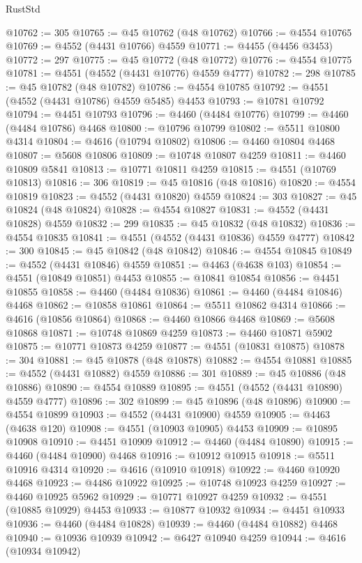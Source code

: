 \begin{lexlean}{RustStd}
\begin{coremodule}
@10762 := 305
@10765 := @45 @10762 (@48 @10762)
@10766 := @4554 @10765
@10769 := @4552 (@4431 @10766) @4559
@10771 := @4455 (@4456 @3453)
@10772 := 297
@10775 := @45 @10772 (@48 @10772)
@10776 := @4554 @10775
@10781 := @4551 (@4552 (@4431 @10776) @4559 @4777)
@10782 := 298
@10785 := @45 @10782 (@48 @10782)
@10786 := @4554 @10785
@10792 := @4551 (@4552 (@4431 @10786) @4559 @5485) @4453
@10793 := @10781 @10792
@10794 := @4451 @10793
@10796 := @4460 (@4484 @10776)
@10799 := @4460 (@4484 @10786) @4468
@10800 := @10796 @10799
@10802 := @5511 @10800 @4314
@10804 := @4616 (@10794 @10802)
@10806 := @4460 @10804 @4468
@10807 := @5608 @10806
@10809 := @10748 @10807 @4259
@10811 := @4460 @10809 @5841
@10813 := @10771 @10811 @4259
@10815 := @4551 (@10769 @10813)
@10816 := 306
@10819 := @45 @10816 (@48 @10816)
@10820 := @4554 @10819
@10823 := @4552 (@4431 @10820) @4559
@10824 := 303
@10827 := @45 @10824 (@48 @10824)
@10828 := @4554 @10827
@10831 := @4552 (@4431 @10828) @4559
@10832 := 299
@10835 := @45 @10832 (@48 @10832)
@10836 := @4554 @10835
@10841 := @4551 (@4552 (@4431 @10836) @4559 @4777)
@10842 := 300
@10845 := @45 @10842 (@48 @10842)
@10846 := @4554 @10845
@10849 := @4552 (@4431 @10846) @4559
@10851 := @4463 (@4638 @103)
@10854 := @4551 (@10849 @10851) @4453
@10855 := @10841 @10854
@10856 := @4451 @10855
@10858 := @4460 (@4484 @10836)
@10861 := @4460 (@4484 @10846) @4468
@10862 := @10858 @10861
@10864 := @5511 @10862 @4314
@10866 := @4616 (@10856 @10864)
@10868 := @4460 @10866 @4468
@10869 := @5608 @10868
@10871 := @10748 @10869 @4259
@10873 := @4460 @10871 @5902
@10875 := @10771 @10873 @4259
@10877 := @4551 (@10831 @10875)
@10878 := 304
@10881 := @45 @10878 (@48 @10878)
@10882 := @4554 @10881
@10885 := @4552 (@4431 @10882) @4559
@10886 := 301
@10889 := @45 @10886 (@48 @10886)
@10890 := @4554 @10889
@10895 := @4551 (@4552 (@4431 @10890) @4559 @4777)
@10896 := 302
@10899 := @45 @10896 (@48 @10896)
@10900 := @4554 @10899
@10903 := @4552 (@4431 @10900) @4559
@10905 := @4463 (@4638 @120)
@10908 := @4551 (@10903 @10905) @4453
@10909 := @10895 @10908
@10910 := @4451 @10909
@10912 := @4460 (@4484 @10890)
@10915 := @4460 (@4484 @10900) @4468
@10916 := @10912 @10915
@10918 := @5511 @10916 @4314
@10920 := @4616 (@10910 @10918)
@10922 := @4460 @10920 @4468
@10923 := @4486 @10922
@10925 := @10748 @10923 @4259
@10927 := @4460 @10925 @5962
@10929 := @10771 @10927 @4259
@10932 := @4551 (@10885 @10929) @4453
@10933 := @10877 @10932
@10934 := @4451 @10933
@10936 := @4460 (@4484 @10828)
@10939 := @4460 (@4484 @10882) @4468
@10940 := @10936 @10939
@10942 := @6427 @10940 @4259
@10944 := @4616 (@10934 @10942)

\end{coremodule}
\end{lexlean}
